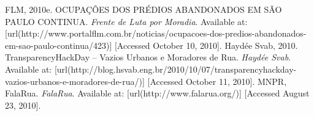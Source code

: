 {\nl%
FLM, 2010e. OCUPAÇÕES DOS PRÉDIOS ABANDONADOS EM SÃO PAULO CONTINUA. {\em Frente de Luta por Moradia}. Available at:  [url(http://www.portalflm.com.br/noticias/ocupacoes-dos-predios-abandonados-em-sao-paulo-continua/423)] [Accessed October 10, 2010].%
\nl%
Haydée Svab, 2010. TransparencyHackDay – Vazios Urbanos e Moradores de Rua. {\em Haydée Svab}. Available at:  [url(http://blog.hsvab.eng.br/2010/10/07/transparencyhackday-vazios-urbanos-e-moradores-de-rua/)] [Accessed October 11, 2010].%
\nl%
MNPR, FalaRua. {\em FalaRua}. Available at:  [url(http://www.falarua.org/)] [Accessed August 23, 2010].%
\stopREF%
}

\stopenvironment